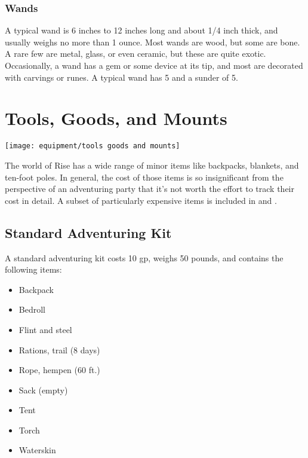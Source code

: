         \subsubsection{Wands}

             A typical wand is 6 inches to 12 inches long and about 1/4 inch thick, and usually weighs no more than 1 ounce.
            Most wands are wood, but some are bone.
            A rare few are metal, glass, or even ceramic, but these are quite exotic.
            Occasionally, a wand has a gem or some device at its tip, and most are decorated with carvings or runes.
            A typical wand has 5  and a sunder  of 5.

    

    

\newpage
\section{Tools, Goods, and Mounts}
    \texttt{[image: equipment/tools goods and mounts]}

    The world of Rise has a wide range of minor items like backpacks, blankets, and ten-foot poles.
    In general, the cost of those items is so insignificant from the perspective of an adventuring party that it's not worth the effort to track their cost in detail.
    A subset of particularly expensive items is included in  and .

    \subsection{Standard Adventuring Kit}
        A standard adventuring kit costs 10 gp, weighs 50 pounds, and contains the following items:
        \begin{itemize}
            \item Backpack
            \item Bedroll
            \item Flint and steel
            \item Rations, trail (8 days)
            \item Rope, hempen (60 ft.)
            \item Sack (empty)
            \item Tent
            \item Torch
            \item Waterskin
        \end{itemize}

    

    
